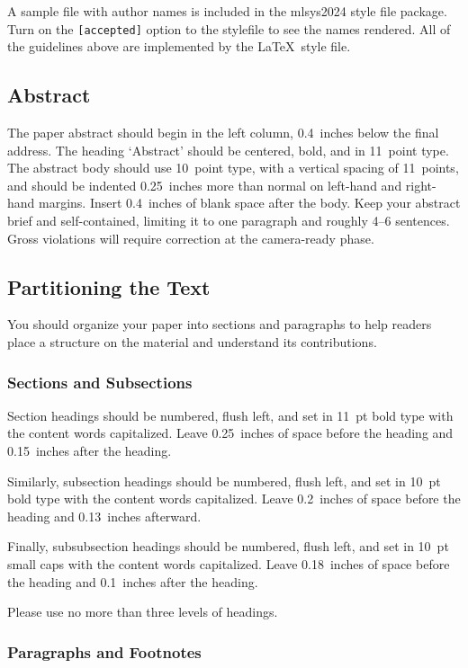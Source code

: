 \documentclass{article}
\begin{document}
A sample file with author names is included in the mlsys2024 style file
package. Turn on the \texttt{[accepted]} option to the stylefile to
see the names rendered. All of the guidelines above are implemented
by the \LaTeX\ style file.

\subsection{Abstract}

The paper abstract should begin in the left column, 0.4~inches below the final
address. The heading `Abstract' should be centered, bold, and in 11~point type.
The abstract body should use 10~point type, with a vertical spacing of
11~points, and should be indented 0.25~inches more than normal on left-hand and
right-hand margins. Insert 0.4~inches of blank space after the body. Keep your
abstract brief and self-contained, limiting it to one paragraph and roughly 4--6
sentences. Gross violations will require correction at the camera-ready phase.

\subsection{Partitioning the Text}

You should organize your paper into sections and paragraphs to help
readers place a structure on the material and understand its
contributions.

\subsubsection{Sections and Subsections}

Section headings should be numbered, flush left, and set in 11~pt bold
type with the content words capitalized. Leave 0.25~inches of space
before the heading and 0.15~inches after the heading.

Similarly, subsection headings should be numbered, flush left, and set
in 10~pt bold type with the content words capitalized. Leave
0.2~inches of space before the heading and 0.13~inches afterward.

Finally, subsubsection headings should be numbered, flush left, and
set in 10~pt small caps with the content words capitalized. Leave
0.18~inches of space before the heading and 0.1~inches after the
heading.

Please use no more than three levels of headings.

\subsubsection{Paragraphs and Footnotes}
\end{document}
